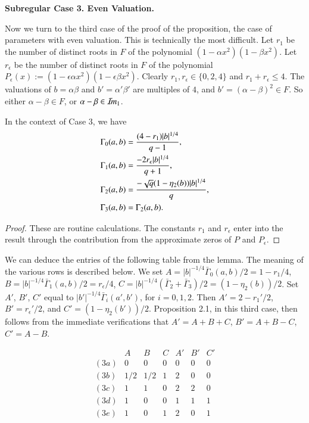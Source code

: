 \documentclass{amsart}
\newcommand\Imm{{\mathcal I\hskip-.2em m}}
\newcommand\bGamma{\bar\Gamma}
\newenvironment{cthm}[1]
  {\renewcommand\thethm{\sc #1}\thm}
  {\endthm}
\begin{document}
\bigskip
\centerline{\bf Subregular Case 3. Even Valuation.}
\bigskip

Now we turn to the third case of the proof of the proposition, the
case of parameters with even valuation.
This is technically the most difficult.
Let $r_1$ be the number of distinct roots in $F$
of the polynomial $(1-\alpha x^2)(1-\beta x^2)$.  Let $r_\epsilon$
be the number of distinct roots in $F$ of the polynomial
$P_\epsilon(x):=(1-\epsilon \alpha x^2)(1-\epsilon\beta x^2)$.  Clearly
$r_1,r_\epsilon\in \{0,2,4\}$ and $r_1+r_\epsilon\le 4$.
The valuations of $b=\alpha\beta$ and $b'=\alpha'\beta'$ are multiples of $4$, 
and
$b'=(\alpha-\beta)^2 \in F$.  So either
$\alpha-\beta\in F$, or $\alpha-\beta\in \Imm_1$.

\smallskip
\noindent
\begin{cthm}{Lemma 2.7}  In the context of Case 3, we have
\begin{align*}
\Gamma_0(a,b) &= {(4-r_1)|b|^{1/4}\over q-1},\\
\Gamma_1(a,b) &= {-2r_\epsilon|b|^{1/4}\over q+1}, \\
\Gamma_2(a,b) &= {-\sqrt{q}(1-\eta_2(b))|b|^{1/4}\over q}, \\
\Gamma_3(a,b) &= \Gamma_2(a,b).
\end{align*}
\end{cthm}

\smallskip
\noindent
\begin{proof} 
These are routine calculations.  The constants
$r_1$ and $r_\epsilon$ enter into the result through the contribution
from the approximate zeros of $P$ and $P_\epsilon$.\end{proof}

We can deduce the entries of the following table from the lemma.
The meaning of the various rows is described below.
We set $A = |b|^{-1/4}\bGamma_0(a,b)/2= 1 - r_1/4$, 
$B=|b|^{-1/4}\bGamma_1(a,b)/2= r_\epsilon/4$, 
$C=|b|^{-1/4}(\bGamma_2+\bGamma_3)/2= (1-\eta_2(b))/2$.
Set $A'$, $B'$, $C'$ 
equal to $|b'|^{-1/4}\bGamma_i(a',b')$, for $i=0,1,2$.
Then $A' = 2-r_1'/2$, $B'= r_\epsilon'/2$, and $C' = (1-\eta_2(b'))/2$.
Proposition 2.1, in this third case, then follows from the immediate
verifications that $A'=A+B+C$, $B'=A+B-C$, $C'=A-B$.

$$\begin{matrix}
&A&B&C&A'&B'&C'\\
(3a)&0&0&0&0&0&0 \\
(3b)&1/2&1/2&1&2&0&0 \\
(3c)&1&1&0&2&2&0 \\
(3d)&1&0&0&1&1&1 \\
(3e)&1&0&1&2&0&1
\end{matrix}
$$
\end{document}
